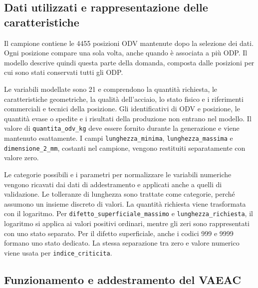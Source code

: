 \subsection{Dati utilizzati e rappresentazione delle caratteristiche}
\label{sec:feature-generation-data}

Il campione contiene le \num{4455} posizioni ODV mantenute dopo la selezione dei dati. Ogni posizione compare una sola volta, anche quando è associata a più ODP. Il modello descrive quindi questa parte della domanda, composta dalle posizioni per cui sono stati conservati tutti gli ODP.

Le variabili modellate sono 21 e comprendono la quantità richiesta, le caratteristiche geometriche, la qualità dell'acciaio, lo stato fisico e i riferimenti commerciali e tecnici della posizione. Gli identificativi di ODV e posizione, le quantità evase o spedite e i risultati della produzione non entrano nel modello. Il valore di \texttt{quantita\_odv\_kg} deve essere fornito durante la generazione e viene mantenuto esattamente. I campi \texttt{lunghezza\_minima}, \texttt{lunghezza\_massima} e \texttt{dimensione\_2\_mm}, costanti nel campione, vengono restituiti separatamente con valore zero.

Le categorie possibili e i parametri per normalizzare le variabili numeriche vengono ricavati dai dati di addestramento e applicati anche a quelli di validazione. Le tolleranze di lunghezza sono trattate come categorie, perché assumono un insieme discreto di valori. La quantità richiesta viene trasformata con il logaritmo. Per \texttt{difetto\_superficiale\_massimo} e \texttt{lunghezza\_richiesta}, il logaritmo si applica ai valori positivi ordinari, mentre gli zeri sono rappresentati con uno stato separato. Per il difetto superficiale, anche i codici 999 e \num{9999} formano uno stato dedicato. La stessa separazione tra zero e valore numerico viene usata per \texttt{indice\_criticita}.

\subsection{Funzionamento e addestramento del VAEAC}
\label{sec:vaeac-training}

